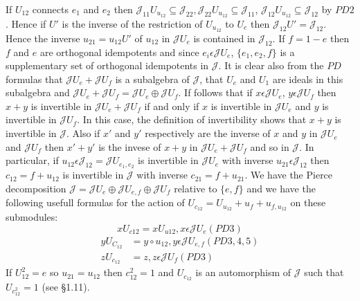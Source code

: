 \begin{defn}
If $U_{12}$ connects $e_1$ and $e_2$ then
$\mathscr{J}_{11}U_{u_{12}}\subseteq
\mathscr{J}_{22},\mathscr{J}_{22}U_{u_{12}}\subseteq
\mathscr{J}_{11}$, $\mathscr{J}_{12}U_{u_{12}}\subseteq\mathscr{J}_{12}$
by $PD 2$. Hence if $U'$ is the inverse of the restriction of
$U_{u_{12}}$ to $U_e$ then
$\mathscr{J}_{12}U'=\mathscr{J}_{12}$. Hence the inverse
$u_{21}=u_{12}U'$ of $u_{12}$ in $\mathscr{J}U_e$ is contained in
$\mathscr{J}_{12}$. If $f=1-e$ then $f$ and $e$ are orthogonal
idempotents and since $e_i\epsilon \mathscr{J}U_e$, $\{e_1, e_2, f\}$
is a supplementary set of orthogonal idempotents in $\mathscr{J}$. It
is clear also from the $PD$ formulas that $\mathscr{J}U_e+\mathscr{J}U_f$
is a subalgebra of $\mathscr{J}$, that $U_e$ and $U_1$ are ideals in
this subalgebra and
$\mathscr{J}U_e+\mathscr{J}U_f=\mathscr{J}U_e\oplus
\mathscr{J}U_f$. If follows that if $x\epsilon \mathscr{J} U_e$,
$y\epsilon \mathscr{J} U_f$ then $x+y$ is invertible in
$\mathscr{J}U_e+\mathscr{J}U_f$ if and only if $x$ is invertible in
$\mathscr{J}U_e$ and $y$ is invertible in $\mathscr{J}U_f$. In this
case, the definition of invertibility shows that $x+y$ is invertible
in $\mathscr{J}$. Also if $x'$ and $y'$ respectively are the inverse
of $x$ and $y$ in $\mathscr{J}U_e$ and $\mathscr{J}U_f$ then $x'+y'$
is the invese of $x+y$ in $\mathscr{J}U_e +\mathscr{J}U_f$ and so in
$\mathscr{J}$. In particular, if  $u_12\epsilon
\mathscr{J}_{12}=\mathscr{J}U_{e_{1},e_{2}}$ is invertible in
$\mathscr{J}U_e$ with inverse $u_{21}\epsilon \mathscr{J}_{12}$ then
$c_{12}=f+u_{12}$ is invertible in $\mathscr{J}$ with inverse
$c_{21}=f+u_{21}$. We have the Pierce decomposition
$\mathscr{J}=\mathscr{J}U_e\oplus \mathscr{J}U_{e,f}\oplus
\mathscr{J}U_f$ relative to $\{e,f\}$ and we have the following
usefull formulas for the action of
$U_{c_{12}}=U_{u_{12}}+u_f+u_{f,u_{12}}$ on these submodules:
$$
xU_{c12}=xU_{u12}, x\epsilon\mathscr{J}U_e(PD 3)
$$\pageoriginale
\begin{align*}
yU_{C_{12}}&=y\circ u_{12},y\epsilon \mathscr{J} U_{e,f}(PD
3,4,5)\tag{34}\label{c2:eq34}\\ 
zU_{c_{12}}&=z,z\epsilon \mathscr{J} U_f (PD 3)
\end{align*}
If $U^{2}_{12}=e$ so $u_{21}=u_{12}$ then $c^{2}_{12}=1$ and
$U_{c_{12}}$ is an automorphism of $\mathscr{J}$ such that
$U_{c^{2}_{12}}=1$ (see \S 1.11).
\end{defn}

